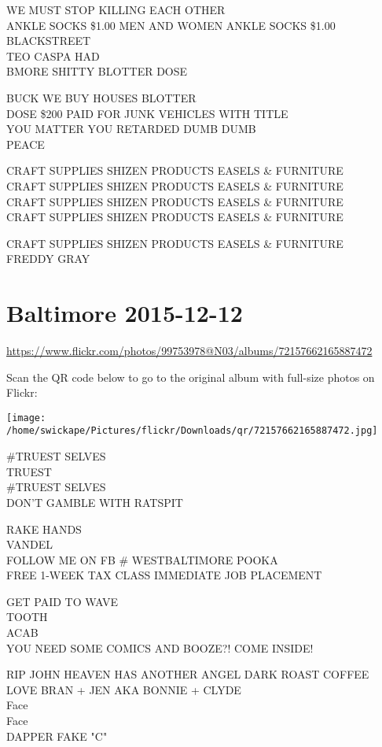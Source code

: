 \documentclass[10pt,letterpaper]{article}
\begin{document}
WE MUST STOP KILLING EACH OTHER\\
ANKLE SOCKS \$1.00 MEN AND WOMEN ANKLE SOCKS \$1.00 BLACKSTREET\\
TEO CASPA HAD\\
BMORE SHITTY BLOTTER DOSE

BUCK WE BUY HOUSES BLOTTER\\
DOSE \$200 PAID FOR JUNK VEHICLES WITH TITLE\\
YOU MATTER YOU RETARDED DUMB DUMB\\
PEACE

CRAFT SUPPLIES SHIZEN PRODUCTS EASELS \& FURNITURE\\
CRAFT SUPPLIES SHIZEN PRODUCTS EASELS \& FURNITURE\\
CRAFT SUPPLIES SHIZEN PRODUCTS EASELS \& FURNITURE\\
CRAFT SUPPLIES SHIZEN PRODUCTS EASELS \& FURNITURE

CRAFT SUPPLIES SHIZEN PRODUCTS EASELS \& FURNITURE\\
FREDDY GRAY


\section*{Baltimore 2015-12-12}

\url{https://www.flickr.com/photos/99753978@N03/albums/72157662165887472}

Scan the QR code below to go to the original album with full-size photos on Flickr:

\texttt{[image: /home/swickape/Pictures/flickr/Downloads/qr/72157662165887472.jpg]}


\#TRUEST SELVES\\
TRUEST\\
\#TRUEST SELVES\\
DON'T GAMBLE WITH RATSPIT

RAKE HANDS\\
VANDEL\\
FOLLOW ME ON FB \# WESTBALTIMORE POOKA\\
FREE 1{-}WEEK TAX CLASS IMMEDIATE JOB PLACEMENT

GET PAID TO WAVE\\
TOOTH\\
ACAB\\
YOU NEED SOME COMICS AND BOOZE?!  COME INSIDE!

RIP JOHN HEAVEN HAS ANOTHER ANGEL DARK ROAST COFFEE LOVE BRAN + JEN AKA BONNIE + CLYDE\\
Face\\
Face\\
DAPPER FAKE "C"
\end{document}
